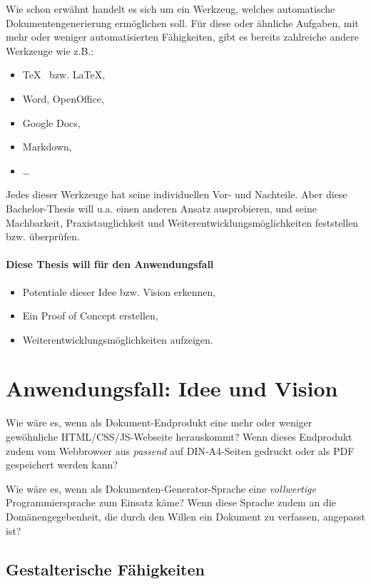 Wie schon erwähnt handelt es sich um ein Werkzeug, welches automatische
Dokumentengenerierung ermöglichen soll. Für diese oder ähnliche Aufgaben,
mit mehr oder weniger automatisierten Fähigkeiten,
gibt es bereits zahlreiche andere Werkzeuge wie z.B.:

\begin{itemize}
  \item \TeX~ bzw. \LaTeX,
  \item Word, OpenOffice,
  \item Google Docs,
  \item Markdown,
  \item \ldots
\end{itemize}

Jedes dieser Werkzeuge hat seine individuellen Vor- und Nachteile.
Aber diese Bachelor-Thesis will u.a. einen anderen Ansatz ausprobieren, und
seine Machbarkeit, Praxistauglichkeit und Weiterentwicklungsmöglichkeiten
feststellen bzw. überprüfen.

\paragraph{Diese Thesis will für den Anwendungsfall}

\begin{itemize}
  \item Potentiale dieser Idee bzw. Vision erkennen,
  \item Ein Proof of Concept erstellen,
  \item Weiterentwicklungsmöglichkeiten aufzeigen.
\end{itemize}

\section{Anwendungsfall: Idee und Vision}\label{sec-idee}

Wie wäre es, wenn als Dokument-Endprodukt eine mehr oder weniger
gewöhnliche HTML/CSS/JS-Webseite herauskommt?
Wenn dieses Endprodukt zudem vom Webbrowser aus \emph{passend} auf
DIN-A4-Seiten gedruckt oder als PDF gespeichert werden kann?

Wie wäre es, wenn als Dokumenten-\-Generator-\-Sprache eine \emph{vollwertige}
Programmiersprache zum Einsatz käme? Wenn diese Sprache zudem an die
Domänen\-gege\-ben\-heit, die durch den Willen ein Dokument zu verfassen,
angepasst ist?

\subsection{Gestalterische Fähigkeiten}

